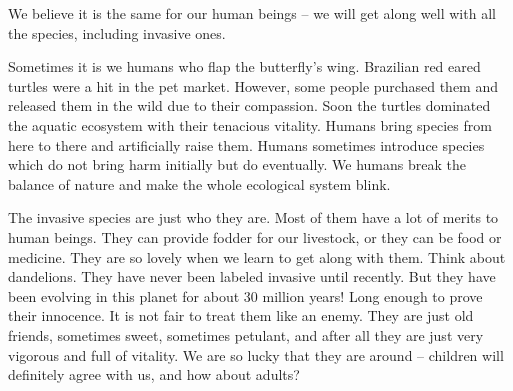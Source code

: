\documentclass[12pt]{article}
\begin{document}
We believe it is the same for our human beings -- we will get along well with all the species, including invasive ones.

Sometimes it is we humans who flap the butterfly's wing.  Brazilian red eared turtles were a hit in the pet market. However, some people purchased them and released them in the wild due to their compassion. Soon the turtles dominated the aquatic ecosystem with their tenacious vitality.  Humans bring species from here to there and artificially raise them.  Humans sometimes introduce species which do not bring harm initially but do eventually.  We humans break the balance of nature and make the whole ecological system blink.

The invasive species are just who they are.  Most of them have a lot of merits to human beings.  They can provide fodder for our livestock, or they can be food or medicine.  They are so lovely when we learn to get along with them.  Think about dandelions.  They have never been labeled invasive until recently.  But they have been evolving in this planet for about 30 million years! Long enough to prove their innocence.  It is not fair to treat them like an enemy.  They are just old friends, sometimes sweet, sometimes petulant, and after all they are just very vigorous and full of vitality.  We are so lucky that they are around -- children will definitely agree with us, and how about adults?

\newpage

\begin{spacing}{0.9}
{}
\newrefcontext
\printbibliography
\end{spacing}
	
\end{document}
